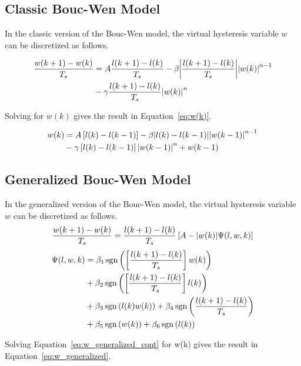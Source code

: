 \subsection{Classic Bouc-Wen Model}

In the classic version of the Bouc-Wen model,
the virtual hysteresis variable $w$ can be discretized as follows.

\begin{align}
\frac{w(k+1)-w(k)}{T_s} &= A \frac{l(k+1)-l(k)}{T_s} - \beta \abs{\frac{l(k+1)-l(k)}{T_s}}\abs{w(k)}^{n-1} \nonumber \\ 
&- \gamma \frac{l(k+1)-l(k)}{T_s} \abs{w(k)}^n
\end{align}

Solving for $w(k)$ gives the result in Equation~\ref{eq:w(k)}.

\begin{align}
w(k) &= A\left[l(k)-l(k-1)\right] - \beta \abs{l(k)-l(k-1)}\abs{w(k-1)}^{n-1} \nonumber \\
 &- \gamma \left[l(k)-l(k-1)\right]\abs{w(k-1)}^n + w(k-1)
 \label{eq:w(k)}
\end{align}

\subsection{Generalized Bouc-Wen Model}

In the generalized version of the Bouc-Wen model,
the virtual hysteresis variable $w$ can be discretized as follows.
\begin{align}
\frac{w(k+1)-w(k)}{T_s} = \frac{l(k+1)-l(k)}{T_s}\left[A - \abs{w(k)}\Psi(l,w,k)\right]
\label{eq:w_generalized_cont}
\end{align}
\begin{equation}
	\begin{split}
	\Psi(l,w,k)&=\beta_1\operatorname{sgn}\left(\left[\frac{l(k+1)-l(k)}{T_s}\right]w(k)\right) \\
	&+\beta_2 \operatorname{sgn}\left(\left[\frac{l(k+1)-l(k)}{T_s}\right]l(k)\right) \\
	&+\beta_3 \operatorname{sgn}\left(l(k)w(k)\right) + \beta_4 \operatorname{sgn}\left(\frac{l(k+1)-l(k)}{T_s}\right) \\
	&+\beta_5 \operatorname{sgn}\left(w(k)\right) + \beta_6 \operatorname{sgn}\left(l(k)\right)
	\end{split}
\end{equation}

Solving Equation~\ref{eq:w_generalized_cont} for w(k) gives the result in Equation~\ref{eq:w_generalized}.

